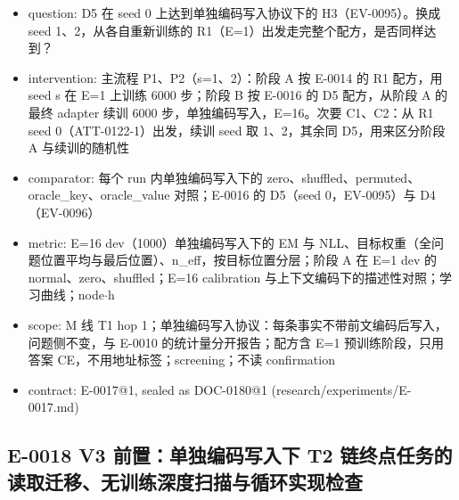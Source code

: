 \documentclass[11pt]{article}
\begin{document}
\begin{itemize}
\item question: D5 在 seed 0 上达到单独编码写入协议下的 H3（EV-0095）。换成 seed 1、2，从各自重新训练的 R1（E=1）出发走完整个配方，是否同样达到？
\item intervention: 主流程 P1、P2（s=1、2）：阶段 A 按 E-0014 的 R1 配方，用 seed s 在 E=1 上训练 6000 步；阶段 B 按 E-0016 的 D5 配方，从阶段 A 的最终 adapter 续训 6000 步，单独编码写入，E=16。次要 C1、C2：从 R1 seed 0（ATT-0122-1）出发，续训 seed 取 1、2，其余同 D5，用来区分阶段 A 与续训的随机性
\item comparator: 每个 run 内单独编码写入下的 zero、shuffled、permuted、oracle\_key、oracle\_value 对照；E-0016 的 D5（seed 0，EV-0095）与 D4（EV-0096）
\item metric: E=16 dev（1000）单独编码写入下的 EM 与 NLL、目标权重（全问题位置平均与最后位置）、n\_eff，按目标位置分层；阶段 A 在 E=1 dev 的 normal、zero、shuffled；E=16 calibration 与上下文编码下的描述性对照；学习曲线；node\ensuremath{\cdot}h
\item scope: M 线 T1 hop 1；单独编码写入协议：每条事实不带前文编码后写入，问题侧不变，与 E-0010 的统计量分开报告；配方含 E=1 预训练阶段，只用答案 CE，不用地址标签；screening；不读 confirmation
\item contract: E-0017@1, sealed as DOC-0180@1 (research/experiments/E-0017.md)
\end{itemize}

\subsection*{E-0018 V3 前置：单独编码写入下 T2 链终点任务的读取迁移、无训练深度扫描与循环实现检查}
\end{document}
